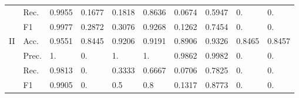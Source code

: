 \begin{tabular}{clllllllll}
                                                                                                    & Rec.                                               & 0.9955                  & 0.1677                  & 0.1818                       & 0.8636                  & 0.0674                             & 0.5947                            & 0.                                        & 0.                                        \\
                                                                                                    & F1                                                   & 0.9977                  & 0.2872                  & 0.3076                       & 0.9268                  & 0.1262                             & 0.7454                            & 0.                                        & 0.                                        \\ 
    \midrule
    \multirow{4}{*}{II}                                                                           & Acc.                                             & 0.9551                  & 0.8445                  & 0.9206                       & 0.9191                  & 0.8906                             & 0.9326                            & 0.8465                                    & 0.8457                                    \\
                                                                                                    & Prec.                                            & 1.                      & 0.                      & 1.                           & 1.                      & 0.9862                             & 0.9982                            & 0.                                        & 0.                                        \\
                                                                                                    & Rec.                                               & 0.9813                  & 0.                      & 0.3333                       & 0.6667                  & 0.0706                             & 0.7825                            & 0.                                        & 0.                                        \\
                                                                                                    & F1                                                   & 0.9905                  & 0.                      & 0.5                          & 0.8                     & 0.1317                             & 0.8773                            & 0.                                        & 0.                                        \\ 

\end{tabular}

